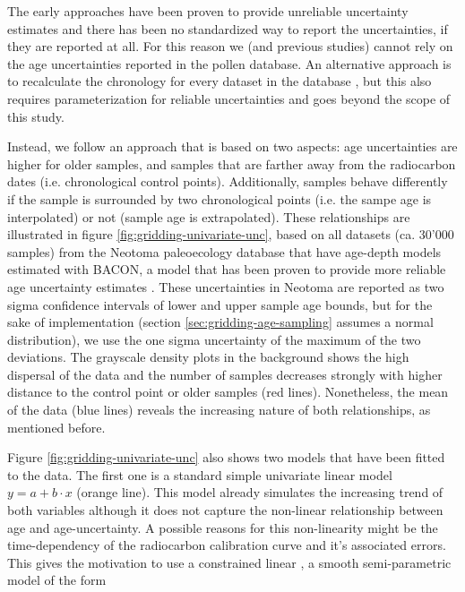 \begin{refsection}
The early approaches have been proven to provide unreliable uncertainty estimates \citep{TelfordHeegaardBirks2004} and there has been no standardized way to report the uncertainties, if they are reported at all. For this reason we (and previous studies) cannot rely on the age uncertainties reported in the pollen database. An alternative approach is to recalculate the chronology for every dataset in the database \citep[see][for instance]{Goring2019}, but this also requires parameterization for reliable uncertainties and goes beyond the scope of this study.

Instead, we follow an approach that is based on two aspects: age uncertainties are higher for older samples, and samples that are farther away from the radiocarbon dates (i.e. chronological control points). Additionally, samples behave differently if the sample is surrounded by two chronological points (i.e. the sampe age is interpolated) or not (sample age is extrapolated). These relationships are illustrated in figure \ref{fig:gridding-univariate-unc}, based on all datasets (ca. 30'000 samples) from the Neotoma paleoecology database \citep{WilliamsGrimmBloisEtAl2018} that have age-depth models estimated with BACON, a model that has been proven to provide more reliable age uncertainty estimates \citep{TrachselTelford2016}. These uncertainties in Neotoma are reported as two sigma confidence intervals of lower and upper sample age bounds, but for the sake of implementation (section \ref{sec:gridding-age-sampling} assumes a normal distribution), we use the one sigma uncertainty of the maximum of the two deviations. The grayscale density plots in the background shows the high dispersal of the data and the number of samples decreases strongly with higher distance to the control point or older samples (red lines). Nonetheless, the mean of the data (blue lines) reveals the increasing nature of both relationships, as mentioned before.

Figure \ref{fig:gridding-univariate-unc} also shows two models that have been fitted to the data. The first one is a standard simple univariate linear model $y = a + b\cdot x$ (orange line). This model already simulates the increasing trend of both variables although it does not capture the non-linear relationship between age and age-uncertainty. A possible reasons for this non-linearity might be the time-dependency of the radiocarbon calibration curve and it's associated errors. This gives the motivation to use a constrained linear , a smooth semi-parametric model of the form


\end{refsection}
